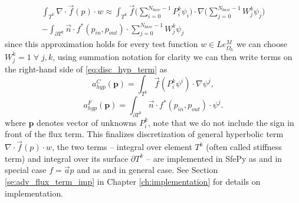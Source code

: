 \begin{multline}
	\label{eq:disc_hyp_term}
	\int_{T^k} \nabla\cdot \vec{f}(p)\cdot w \approx \int_{T^k} 
	\vec{f}\Big(\sum\limits_{i=0}^{N_{base} - 1} 
	P_i^k\psi_i\Big)\cdot\nabla\Big(\sum\limits_{j=0}^{N_{base} - 1} 
	W_j^k\psi_j\Big)\\	
	-\int_{\partial{T^k}} \vec{n} \cdot f^{*} (p_{in}, p_{out})\cdot 
	\sum\limits_{j=0}^{N_{base} - 1} W_j^k\psi_j
\end{multline}
since this approximation holds for every test function $w \in 
Le_{\Omega_h}^{M}$ we can choose $W_j^k = 1 \; \forall \; 
j, k$, using summation notation for clarity we can then write terms on the  right-hand 
side of \eqref{eq:disc_hyp_term} as 
\begin{equation}\label{eq:hyp_stiff_app}
		a^C_{hyp}(\mathbf{p}) = \int_{T^k} \vec{f}(P_i^k\psi^i)\cdot\nabla\psi^j, 
\end{equation}
\begin{equation}\label{eq:hyp_flux_app}
	a^F_{hyp}(\mathbf{p}) = \int_{\partial{T^k}} \vec{n} \cdot f^{*} (p_{in}, 
	p_{out})\cdot\psi^j.
\end{equation}
where $\mathbf{p}$ denotes vector of unknowns $P^k_i$, note that we do not include the 
sign in front of the flux term.
This finalizes discretization of general hyperbolic term $\nabla\cdot\vec{f}(p) 
\cdot w$, the two terms -- integral over element $T^k$ (often called stiffness 
term) and integral over its surface $\partial T^k$ -- are implemented in SfePy 
as  and  in special 
case $f = \vec{a}p$ and as  and 
 in general case. See Section 
\ref{se:adv_flux_term_imp} in Chapter \ref{ch:implementation} for details on 
implementation.


